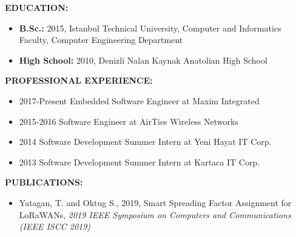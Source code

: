 \textbf{EDUCATION:} 
\vspace{-3mm}
\begin{itemize}
  \item \textbf{B.Sc.:} 2015, Istanbul Technical University, Computer and Informatics Faculty, Computer Engineering Department
  \item \textbf{High School:} 2010, Denizli Nalan Kaynak Anatolian High School
\end{itemize}

\textbf{PROFESSIONAL EXPERIENCE:}   
\vspace{-3mm}
\begin{itemize}
  \item 2017-Present Embedded Software Engineer at Maxim Integrated
  \item 2015-2016 Software Engineer at AirTies Wireless Networks
  \item 2014 Software Development Summer Intern at Yeni Hayat IT Corp.
  \item 2013 Software Development Summer Intern at Kartaca IT Corp.
\end{itemize}

\textbf{PUBLICATIONS:} 
\vspace{-3mm}
\begin{itemize}
   \item Yatagan, T. and Oktug S., 2019, Smart Spreading Factor Assignment for LoRaWANs, 
   \textit{2019 IEEE Symposium on Computers and Communications (IEEE ISCC 2019)}
\end{itemize}

\vspace{-3mm}
